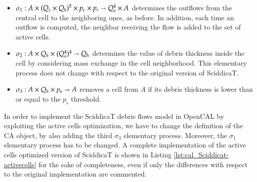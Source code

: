 \begin{itemize}
\item $\sigma_1 : A \times (Q_z \times Q_h)^5 \times p_\epsilon \times p_r
  \shortrightarrow Q_o^4 \times A$ determines the outflows from the
  central cell to the neighboring ones, as before. In addition, each
  time an outflow is computed, the neighbor receiving the flow is
  added to the set of active cells.

\item $\sigma_2: A \times Q_h \times (Q_o^4)^4 \shortrightarrow Q_h$ determines
  the value of debris thickness inside the cell by considering mass
  exchange in the cell neighborhood. This elementary process does not
  change with respect to the original version of SciddicaT.

\item $\sigma_3: A \times Q_h \times p_\epsilon \shortrightarrow A$
  removes a cell from $A$ if its debris thickness is lower than or
  equal to the $p_\epsilon$ threshold.
\end{itemize}

In order to implement the SciddicaT debris flows model in OpenCAL by
exploiting the active cells optimization, we have to change the
definition of the CA object, by also adding the third $\sigma_3$
elementary process. Moreover, the $\sigma_1$ elementary process has to
be changed. A complete implementation of the active cells optimized
version of SciddicaT is shown in Listing
\ref{lst:cal_Sciddicat-activecells} for the sake of completeness, even
if only the differences with respect to the original implementation
are commented.





